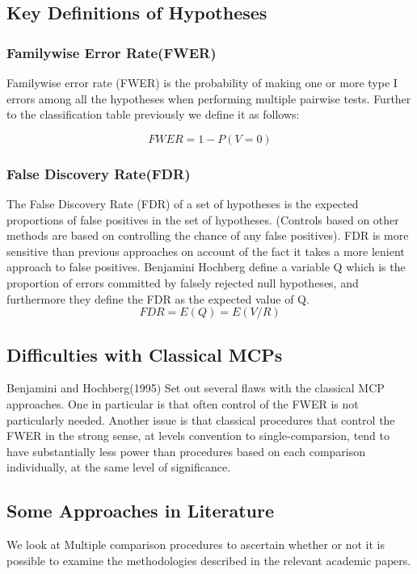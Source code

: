 \documentclass{article}
\begin{document}
\subsection*{Key Definitions of Hypotheses }
\subsubsection*{Familywise Error Rate(FWER) }
Familywise error rate (FWER) is the probability of making one or
more type I errors among all the hypotheses when performing
multiple pairwise tests. Further to the classification table
previously we define it as follows:

\[ FWER = 1- P(V = 0 ) \]

\subsubsection*{False Discovery Rate(FDR) }
The False Discovery Rate (FDR) of a set of hypotheses is the
expected proportions of false positives in the set of hypotheses.
(Controls based on other methods are based on controlling the
chance of any false positives). FDR is more sensitive than
previous approaches on account of the fact it takes a more lenient
approach to false positives. Benjamini Hochberg define a variable
Q which is the proportion of errors committed by falsely rejected
null hypotheses, and furthermore they define the FDR as the
expected value of Q.
\[ FDR = E(Q)= E(V/R ) \]


\subsection*{Difficulties with Classical MCPs }
Benjamini and Hochberg(1995) Set out several flaws with the
classical MCP approaches. One in particular is that often control
of the FWER is not particularly needed. Another issue is that
classical procedures that control the FWER in the strong sense, at
levels convention to single-comparsion, tend to have substantially
less power than procedures based on each comparison individually,
at the same level of significance.


\subsection*{Some Approaches in Literature}

We look at Multiple comparison procedures to ascertain whether or
not it is possible to examine the methodologies described in the
relevant academic papers.
\end{document}
